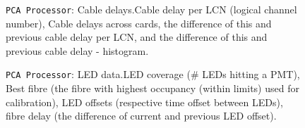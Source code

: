 \documentclass[12pt]{article}
\begin{document}
\begin{figure}
\centering
\noindent{}
  \caption{\centering \texttt{PCA Processor}: Cable delays.\hspace{\textwidth}Cable delay per LCN (logical channel number), Cable delays across cards, the difference of this and previous cable delay per LCN, and the difference of this and previous cable delay - histogram. }
  \label{fig:pca2}
\end{figure}

\begin{figure}
\centering
\noindent{}
  \caption{\centering \texttt{PCA Processor}: LED data.\hspace{\textwidth}LED coverage (\# LEDs hitting a PMT), Best fibre (the fibre with highest occupancy (within limits) used for calibration), LED offsets (respective time offset between LEDs), fibre delay (the difference of current and previous LED offset).}
  \label{fig:pca3}
\end{figure}
\end{document}
